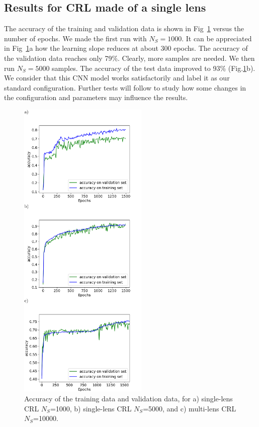 \documentclass[preprint]{iucr}
\newcommand{\inred}[1]{{\color{red}#1}}
\begin{document}
\subsection{Results for CRL made of a single lens}
 The accuracy of the training and validation data is shown in Fig~\ref{fig:v12v13} versus the number of epochs.
 We made the first run with $N_S=1000$.
 \inred{It can be appreciated in Fig~\ref{fig:v12v13}a how the learning slope reduces at about 300 epochs. The accuracy of the validation data reaches only 79\%.}
 Clearly, more samples are needed. We then run $N_S=5000$ samples. The accuracy of the test data improved to 93\% (Fig.\ref{fig:v12v13}b). 
 We consider that this CNN model works satisfactorily and label it as our standard configuration. Further tests will follow to study how some changes in the configuration and parameters may influence the results.

\begin{figure}\label{fig:v12v13}
    \includegraphics[width=0.55\textwidth]{figures/figure3.pdf}
    \caption{Accuracy of the training data and validation data, for a) single-lens CRL $N_S$=1000, b) single-lens CRL $N_S$=5000, and c) multi-lens CRL $N_S$=10000.
    }
\end{figure}
\end{document}

